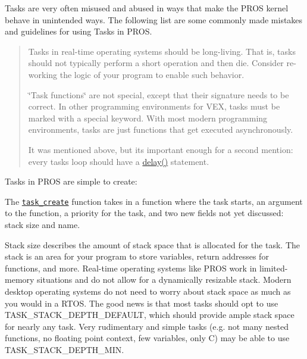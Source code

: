 Tasks are very often misused and abused in ways that make the P\+R\+OS kernel behave in unintended ways. The following list are some commonly made mistakes and guidelines for using Tasks in P\+R\+OS.

\begin{quote}

\begin{DoxyItemize}
\item Tasks in real-\/time operating systems should be long-\/living. That is, tasks should not typically perform a short operation and then die. Consider re-\/working the logic of your program to enable such behavior.
\item \char`\"{}\+Task functions\char`\"{} are not special, except that their signature needs to be correct. In other programming environments for V\+EX, tasks must be marked with a special keyword. With most modern programming environments, tasks are just functions that get executed asynchronously.
\item It was mentioned above, but it\textquotesingle{}s important enough for a second mention\+: every tasks\textquotesingle{} loop should have a {\ttfamily \hyperlink{rtos_8h_ab8c5a8048d5576a33d7f79b95a2fa0dd}{delay()}} statement. 
\end{DoxyItemize}\end{quote}


Tasks in P\+R\+OS are simple to create\+:

The \href{../../api/c/rtos.html#task_create}{\tt task\+\_\+create} function takes in a function where the task starts, an argument to the function, a priority for the task, and two new fields not yet discussed\+: stack size and name.

Stack size describes the amount of stack space that is allocated for the task. The stack is an area for your program to store variables, return addresses for functions, and more. Real-\/time operating systems like P\+R\+OS work in limited-\/memory situations and do not allow for a dynamically resizable stack. Modern desktop operating systems do not need to worry about stack space as much as you would in a R\+T\+OS. The good news is that most tasks should opt to use {\ttfamily T\+A\+S\+K\+\_\+\+S\+T\+A\+C\+K\+\_\+\+D\+E\+P\+T\+H\+\_\+\+D\+E\+F\+A\+U\+LT}, which should provide ample stack space for nearly any task. Very rudimentary and simple tasks (e.\+g. not many nested functions, no floating point context, few variables, only C) may be able to use {\ttfamily T\+A\+S\+K\+\_\+\+S\+T\+A\+C\+K\+\_\+\+D\+E\+P\+T\+H\+\_\+\+M\+IN}.


